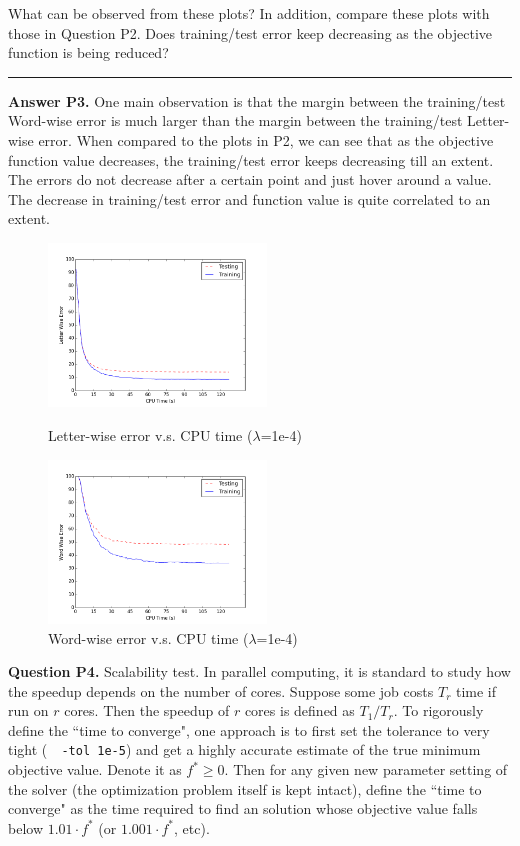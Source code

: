 \documentclass[11pt]{report}
\begin{document}
What can be observed from these plots?
In addition, compare these plots with those in Question P2.
Does training/test error keep decreasing as the objective function is being reduced?

\rule{\paperwidth}{0.6pt}
{\bf Answer P3.} One main observation is that the margin between the training/test Word-wise error is much larger than the margin between the training/test Letter-wise error. When compared to the plots in P2, we can see that as the objective function value decreases, the training/test error keeps decreasing till an extent. The errors do not decrease after a certain point and just hover around a value. The decrease in training/test error and function value is quite correlated to an extent.

\begin{figure}[t]
	\centering
	\begin{minipage}[t]{0.49\textwidth}
		\centering
		\includegraphics[width=5.8cm]{q3-a}
		\caption{Letter-wise error v.s. CPU time ($\lambda$=1e-4)}
		\label{fig:letter_err}
	\end{minipage}
	\begin{minipage}[t]{0.49\textwidth}
		\centering
		\includegraphics[width=5.8cm]{q3-b}
		\caption{Word-wise error v.s. CPU time ($\lambda$=1e-4)}
		\label{fig:word_err}
	\end{minipage}
\end{figure}

{\bf Question P4.}
Scalability test.
In parallel computing, it is standard to study how the speedup depends on the number of cores.
Suppose some job costs $T_r$ time if run on $r$ cores.
Then the speedup of $r$ cores is defined as $T_1 / T_r$.
To rigorously define the ``time to converge",
one approach is to first set the tolerance to very tight (\eg\ \verb! -tol 1e-5!)
and get a highly accurate estimate of the true minimum objective value.
Denote it as $f^* \ge 0$.
Then for any given new parameter setting of the solver (the optimization problem itself is kept intact), define the ``time to converge" as the time required to find an solution whose objective value falls below $1.01 \cdot f^*$ (or  $1.001 \cdot f^*$, etc).
\end{document}
